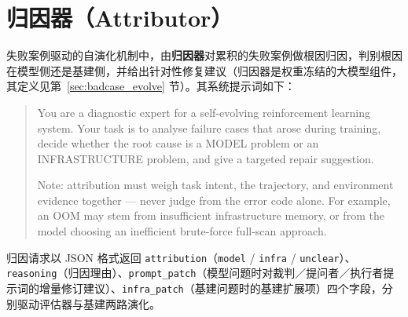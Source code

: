 \section{归因器（Attributor）}

失败案例驱动的自演化机制中，由\textbf{归因器}对累积的失败案例做根因归因，判别根因在模型侧还是基建侧，并给出针对性修复建议（归因器是权重冻结的大模型组件，其定义见第~\ref{sec:badcase_evolve} 节）。其系统提示词如下：

\begin{quote}\small
You are a diagnostic expert for a self-evolving reinforcement learning system. Your task is to analyse failure cases that arose during training, decide whether the root cause is a MODEL problem or an INFRASTRUCTURE problem, and give a targeted repair suggestion.

Note: attribution must weigh task intent, the trajectory, and environment evidence together — never judge from the error code alone. For example, an OOM may stem from insufficient infrastructure memory, or from the model choosing an inefficient brute-force full-scan approach.
\end{quote}

归因请求以 JSON 格式返回 \texttt{attribution}（\texttt{model} / \texttt{infra} / \texttt{unclear}）、\texttt{reasoning}（归因理由）、\texttt{prompt\_patch}（模型问题时对裁判／提问者／执行者提示词的增量修订建议）、\texttt{infra\_patch}（基建问题时的基建扩展项）四个字段，分别驱动评估器与基建两路演化。
